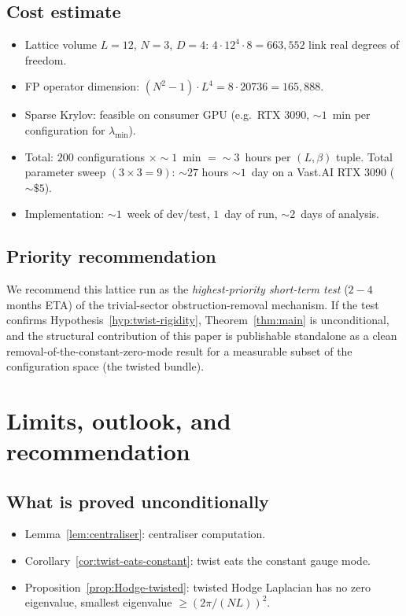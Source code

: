 \documentclass[11pt,a4paper]{amsart}
\theoremstyle{definition}
\begin{document}
\subsection{Cost estimate}
\begin{itemize}[leftmargin=2em]
\item Lattice volume $L = 12$, $N = 3$, $D = 4$: $4 \cdot 12^4 \cdot 8 = 663{,}552$
link real degrees of freedom.
\item FP operator dimension: $(N^2-1)\cdot L^4 = 8 \cdot 20736 = 165{,}888$.
\item Sparse Krylov: feasible on consumer GPU (e.g.\ RTX 3090, $\sim 1$~min
per configuration for $\lambda_{\min}$).
\item Total: $200$ configurations $\times \sim 1$~min $= \sim 3$~hours
per $(L,\beta)$ tuple. Total parameter sweep $(3 \times 3 = 9)$:
$\sim 27$ hours $\sim 1$~day on a Vast.AI RTX 3090 ($\sim \$5$).
\item Implementation: $\sim 1$~week of dev/test, $1$~day of run, $\sim 2$~days
of analysis.
\end{itemize}

\subsection{Priority recommendation}
We recommend this lattice run as the \emph{highest-priority short-term
test} ($2-4$ months ETA) of the trivial-sector obstruction-removal
mechanism. If the test confirms Hypothesis~\ref{hyp:twist-rigidity},
Theorem~\ref{thm:main} is unconditional, and the structural
contribution of this paper is publishable standalone as a clean
removal-of-the-constant-zero-mode result for a measurable subset of the
configuration space (the twisted bundle).

\section{Limits, outlook, and recommendation}\label{sec:outlook}

\subsection{What is proved unconditionally}
\begin{itemize}[leftmargin=2em]
\item Lemma~\ref{lem:centraliser}: centraliser computation.
\item Corollary~\ref{cor:twist-eats-constant}: twist eats the constant
gauge mode.
\item Proposition~\ref{prop:Hodge-twisted}: twisted Hodge Laplacian
has no zero eigenvalue, smallest eigenvalue $\geq (2\pi/(NL))^2$.
\end{itemize}
\end{document}
